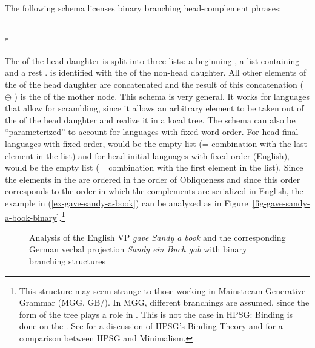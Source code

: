 \documentclass[output=paper
                ,modfonts
                ,nonflat
	        ,collection
	        ,collectionchapter
	        ,collectiontoclongg
 	        ,biblatex
                ,babelshorthands
                ,newtxmath
                ,draftmode
                ,colorlinks, citecolor=brown
]{./langsci/langscibook}
\begin{document}
The following schema licenses binary branching head-complement phrases:
\begin{schema}
\label{hcs-binary}
 \impl\\*
\end{schema}
The \compsl of the head daughter is split into three lists: a beginning , a list containing  and a rest
.  is identified with the \synsemv of the non-head daughter. All other elements of
the \compsl of the head daughter are concatenated and the result of this concatenation (
$\oplus$ ) is the \compsl of the mother node. This schema is very general. It works for
languages that allow for scrambling, since it allows an arbitrary element to be taken out of the \compsl
of the head daughter and realize it in a local tree. The schema can also be ``parameterized'' to account
for languages with fixed word order. For head-final languages with fixed order,  would be the
empty list (= combination with the last element in the list) and for head-initial languages with
fixed order (\eg English),  would be the empty list (= combination with the first element in
the list). Since the elements in the \compsl are ordered in the order of Obliqueness \citep{KC77a,Pullum77a} and since this
order corresponds to the order in which the complements are serialized in English, the example in (\ref{ex-gave-sandy-a-book}) can be
analyzed as in Figure~\ref{fig-gave-sandy-a-book-binary}.\footnote{
  This structure may seem strange to those working in Mainstream Generative Grammar (MGG,
  GB/). In MGG, different branchings are assumed, since the form of the tree plays a role in
  . This is not the case in HPSG: Binding is done on the \argstl. See
   for a discussion of HPSG's Binding Theory and
   for a comparison between HPSG and Minimalism.%
}
\begin{figure}
\hfill
{}
\caption{\label{fig-gave-sandy-a-book-binary}\label{fig-sandy-ein-buch-gab}Analysis of the English VP \emph{gave Sandy a book} and
  the corresponding German verbal projection \emph{Sandy ein Buch gab} with binary branching structures}
\end{figure}
\end{document}
